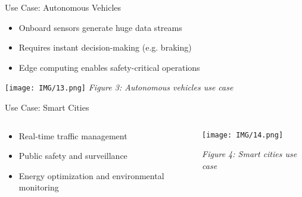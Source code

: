\documentclass{beamer}
\begin{document}
\begin{frame}{Use Case: Autonomous Vehicles}
  \begin{itemize}
    \item Onboard sensors generate huge data streams
    \item Requires instant decision-making (e.g. braking)
    \item Edge computing enables safety-critical operations
  \end{itemize}
  \vspace{0.2cm}
  \centering
  \texttt{[image: IMG/13.png]} %
  \vspace{0.2cm}
  \small \textit{Figure 3: Autonomous vehicles use case}
\end{frame}

\begin{frame}{Use Case: Smart Cities}
    \begin{columns}[t]  %
      \begin{column}{0.5\textwidth}
        \begin{itemize}
          \item Real-time traffic management
          \item Public safety and surveillance
          \item Energy optimization and environmental monitoring
        \end{itemize}
      \end{column}
  
      \begin{column}{0.5\textwidth}
        \texttt{[image: IMG/14.png]}
        \vspace{0.2cm}
  
        \small \textit{Figure 4: Smart cities use case}
      \end{column}
    \end{columns}
  
  \end{frame}
  
\end{document}
